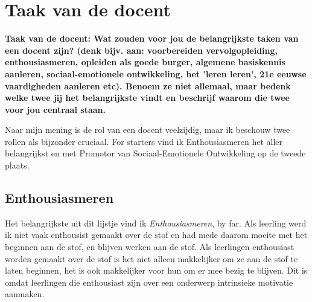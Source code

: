     \section{Taak van de docent}
        \textbf{Taak van de docent: Wat zouden voor jou de belangrijkste taken van een docent zijn? (denk bijv. aan: voorbereiden vervolgopleiding, enthousiasmeren, opleiden als goede burger, algemene basiskennis aanleren, sociaal-emotionele ontwikkeling, het 'leren leren', 21e eeuwse vaardigheden aanleren etc). Benoem ze niet allemaal, maar bedenk welke twee jij het belangrijkste vindt en beschrijf waarom die twee voor jou centraal staan.}

        \bigskip
        
        \noindent Naar mijn mening is de rol van een docent veelzijdig, maar ik beschouw twee rollen als bijzonder cruciaal. For starters vind ik Enthousiasmeren het aller belangrijkst en met Promotor van Sociaal-Emotionele Ontwikkeling op de tweede plaats.
        
        \subsection{Enthousiasmeren}
            Het belangrijkste uit dit lijstje vind ik \textit{Enthousiasmeren}, by far. Als leerling werd ik niet vaak enthousist gemaakt over de stof en had mede daarom moeite met het beginnen aan de stof, en blijven werken aan de stof. Als leerlingen enthousiast worden gemaakt over de stof is het niet alleen makkelijker om ze aan de stof te laten beginnen, het is ook makkelijker voor hun om er mee bezig te blijven. Dit is omdat leerlingen die enthousiast zijn over een onderwerp intrinsieke motivatie aanmaken.\cite{enthusiasm-creates-motivation}

            \bigskip
        
